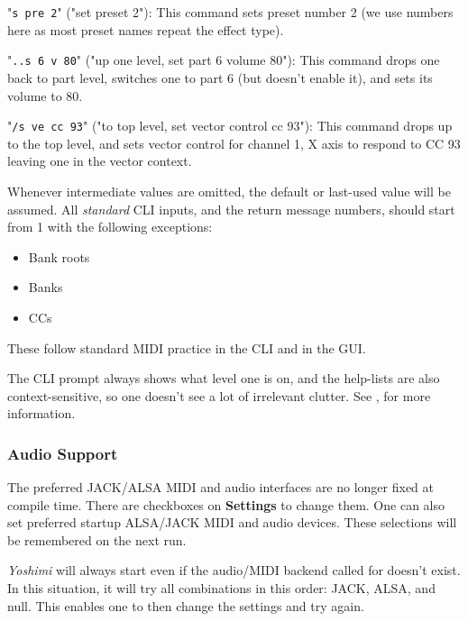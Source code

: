 \documentclass[
 11pt,
 twoside,
 a4paper,
 final                                 %
]{article}
\begin{document}
   "\texttt{s pre 2}" ("set preset 2"):
   This command sets preset number 2 (we use numbers here as most preset names
   repeat the effect type).

   "\texttt{..s 6 v 80}" ("up one level, set part 6 volume 80"):
   This command drops one back to part level, switches one to part 6 (but doesn't
   enable it), and sets its volume to 80.

   "\texttt{/s ve cc 93}" ("to top level, set vector control cc 93"):
   This command drops up to the top level, and sets vector control for
   channel 1, X axis to respond to CC 93 leaving one in the vector context.

   Whenever intermediate values are omitted, the default or last-used value
   will be assumed.
   All \textsl{standard} CLI inputs, and the return message numbers,
   should start from 1 with the following exceptions:

    \begin{itemize}
       \item Bank roots
       \item Banks
       \item CCs
       \end{itemize}

   These follow standard MIDI practice in the CLI and in the GUI.

   The CLI prompt always
   shows what level one is on, and the help-lists are also
   context-sensitive, so one doesn't see a lot of irrelevant clutter.
   See , for more information.

\subsubsection{Audio Support}
\label{subsubsec:new_features_audio_support}

   The preferred JACK/ALSA MIDI and audio interfaces are no longer fixed at
   compile time. There are checkboxes on \textbf{Settings} to change them.
   One can also set preferred startup ALSA/JACK MIDI and audio devices.
   These selections will be remembered on the next run.

   \textsl{Yoshimi} will always start even if the audio/MIDI backend called
   for doesn't exist. In this situation, it will try all combinations in this
   order: JACK, ALSA, and null. This enables one to then change the settings
   and try again.
\end{document}
